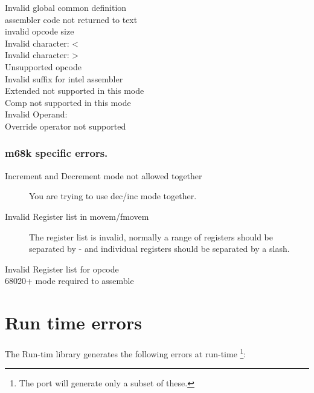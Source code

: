 \documentclass{report}
\begin{document}
\begin{description}
\item [ Invalid global common definition ]
\item [ assembler code not returned to text ]
\item [ invalid opcode size ]
\item [ Invalid character: < ]
\item [ Invalid character: > ]
\item [ Unsupported opcode ]
\item [ Invalid suffix for intel assembler ]
\item [ Extended not supported in this mode ]
\item [ Comp not supported in this mode ]
\item [ Invalid Operand: ]
\item [ Override operator not supported ]
\end{description}

\subsection{m68k specific errors.}
\begin{description}
\item [Increment and Decrement mode not allowed together]
You are trying to use dec/inc mode together.

\item [Invalid Register list in movem/fmovem]
The register list is invalid, normally a range of registers should
be separated by - and individual registers should be separated by
a slash.
\item [Invalid Register list for opcode]
\item [68020+ mode required to assemble]
\end{description}

\chapter{Run time errors}
The \fpc Run-tim library generates the following errors at run-time
\footnote{The \linux port will generate only a subset of these.}:
\end{document}
